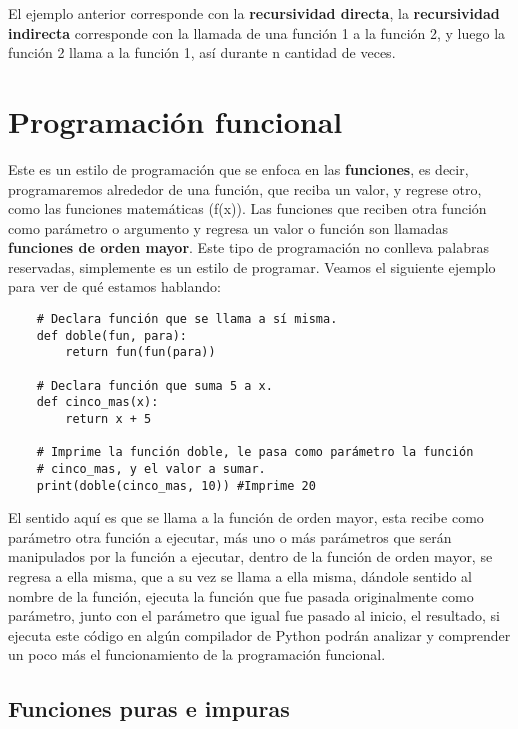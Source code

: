 El ejemplo anterior corresponde con la \textbf{recursividad directa}, la \textbf{recursividad indirecta} corresponde con la llamada de una función 1 a la función 2, y luego la función 2 llama a la función 1, así durante n cantidad de veces.



\section{Programación funcional}

Este es un estilo de programación que se enfoca en las \textbf{funciones}, es decir, programaremos alrededor de una función, que reciba un valor, y regrese otro, como las funciones matemáticas (f(x)). Las funciones que reciben otra función como parámetro o argumento y regresa un valor o función son llamadas \textbf{funciones de orden mayor}. Este tipo de programación no conlleva palabras reservadas, simplemente es un estilo de programar. Veamos el siguiente ejemplo para ver de qué estamos hablando:
\begin{lstlisting}
    # Declara función que se llama a sí misma.
    def doble(fun, para):
        return fun(fun(para))

    # Declara función que suma 5 a x.
    def cinco_mas(x):
        return x + 5
   
    # Imprime la función doble, le pasa como parámetro la función
    # cinco_mas, y el valor a sumar.
    print(doble(cinco_mas, 10)) #Imprime 20
\end{lstlisting}

El sentido aquí es que se llama a la función de orden mayor, esta recibe como parámetro otra función a ejecutar, más uno o más parámetros que serán manipulados por la función a ejecutar, dentro de la función de orden mayor, se regresa a ella misma, que a su vez se llama a ella misma, dándole sentido al nombre de la función, ejecuta la función que fue pasada originalmente como parámetro, junto con el parámetro que igual fue pasado al inicio, el resultado, si ejecuta este código en algún compilador de Python podrán analizar y comprender un poco más el funcionamiento de la programación funcional.


\subsection{Funciones puras e impuras}

